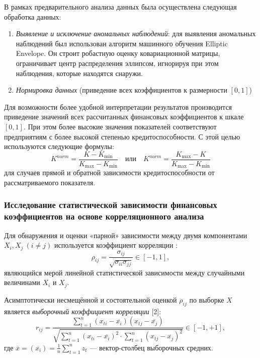 \documentclass[14pt,a4paper]{extarticle}
\begin{document}
В рамках предварительного анализа данных была осуществлена следующая обработка данных:
\begin{enumerate}
    \item \textit{Выявление и исключение аномальных наблюдений}: для выявления аномальных наблюдений был 
    использован алгоритм машинного обучения Elliptic Envelope. Он строит робастную оценку ковариационной 
    матрицы, ограничивает центр распределения эллипсом, игнорируя при этом наблюдения, которые находятся 
    снаружи.
    \item \textit{Нормировка данных} (приведение всех коэффициентов к размерности $[0,1]$)
\end{enumerate}
Для возможности более удобной интерпретации результатов производится приведение значений всех рассчитанных 
финансовых коэффициентов к шкале $[0,1]$. При этом более высокие значения показателей соответствуют 
предприятиям с более высокой степенью кредитоспособности. С этой целью используются следующие формулы:
\[
K^{norm} = \frac{K - K_{\min}}{K_{\max} - K_{\min}} \quad \text{или} \quad K^{norm} = \frac{K_{\max} - K}
{K_{\max} - K_{\min}}
\]
для случаев прямой и обратной зависимости кредитоспособности от рассматриваемого показателя.

\subsubsection{Исследование статистической зависимости финансовых коэффициентов на основе корреляционного 
анализа}

Для обнаружения и оценки «парной» зависимости между двумя компонентами $X_{i}, X_{j}\ (i \neq j)$ 
используется коэффициент корреляции \cite{2}:
\begin{equation}
\rho_{ij} = \frac{\sigma_{ij}}{\sqrt{\sigma_{ii}\sigma_{jj}}} \in [-1,1],
\end{equation}
являющийся мерой линейной статистической зависимости между случайными величинами $X_{i}$ и $X_{j}$.

Асимптотически несмещённой и состоятельной оценкой $\rho_{ij}$ по выборке $X$ является \textit{выборочный 
коэффициент корреляции} [2]:
\begin{equation}
r_{ij} = \frac{\sum_{t=1}^{n} (x_{ti} - \overline{x_{i}})(x_{tj} - \overline{x_{j}})}{\sqrt{\sum_{t=1}^{n} 
(x_{ti} - \overline{x_{i}})^{2} \cdot \sum_{t=1}^{n} (x_{tj} - \overline{x_{j}})^{2}}} \in [-1,+1],
\end{equation}
где $\overline{x} = (\overline{x_{i}}) = \frac{1}{n}\sum_{t=1}^{n} z_{t}$ --- вектор-столбец выборочных 
средних.
\end{document}

